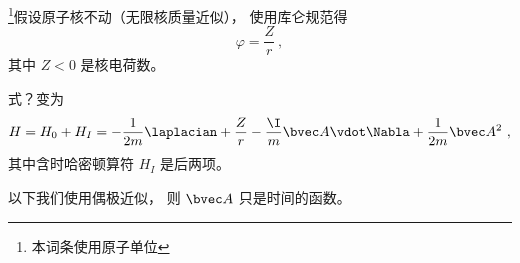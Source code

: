
\begin{issues}
\issueDraft
\end{issues}


\footnote{本词条使用原子单位}假设原子核不动（无限核质量近似）， 使用库仑规范得
\begin{equation}
\varphi = \frac{Z}{r}~,
\end{equation}
其中 $Z < 0$ 是核电荷数。

式？变为
\begin{equation}
H = H_0 + H_I = -\frac{1}{2m} \laplacian +  \frac{Z}{r} - \frac{\I}{m} \bvec A \vdot \Nabla + \frac{1}{2m} \bvec A^2~,
\end{equation}
其中含时哈密顿算符 $H_I$ 是后两项。

以下我们使用偶极近似， 则 $\bvec A$ 只是时间的函数。
